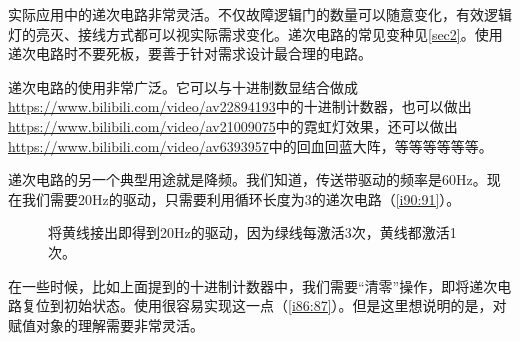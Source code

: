 实际应用中的递次电路非常灵活。不仅故障逻辑门的数量可以随意变化，有效逻辑灯的亮灭、接线方式都可以视实际需求变化。递次电路的常见变种见\autoref{sec2}。使用递次电路时不要死板，要善于针对需求设计最合理的电路。

递次电路的使用非常广泛。它可以与十进制数显结合做成\url{https://www.bilibili.com/video/av22894193}中的十进制计数器，也可以做出\url{https://www.bilibili.com/video/av21009075}中的霓虹灯效果，还可以做出\url{https://www.bilibili.com/video/av6393957}中的回血回蓝大阵，等等等等等等。

递次电路的另一个典型用途就是降频。我们知道，传送带驱动的频率是60Hz。现在我们需要20Hz的驱动，只需要利用循环长度为3的递次电路（\autoref{i90:91}）。

\begin{figure}[!ht]
\begin{center}
\end{center}
\caption{将黄线接出即得到20Hz的驱动，因为绿线每激活3次，黄线都激活1次。}
\label{i90:91}
\end{figure}

在一些时候，比如上面提到的十进制计数器中，我们需要“清零”操作，即将递次电路复位到初始状态。使用很容易实现这一点（\autoref{i86:87}）。但是这里想说明的是，对赋值对象的理解需要非常灵活。

